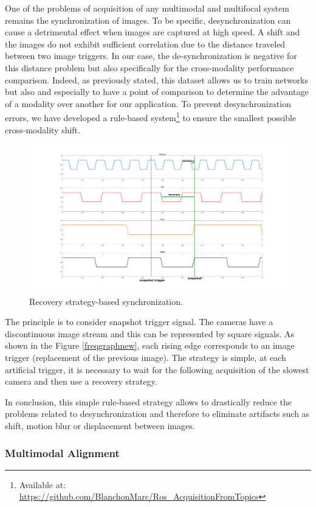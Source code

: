 One of the problems of acquisition of any multimodal and multifocal system remains the synchronization of images. To be specific, desynchronization can cause a detrimental effect when images are captured at high speed. A shift and the images do not exhibit sufficient correlation due to the distance traveled between two image triggers.
In our case, the de-synchronization is negative for this distance problem but also specifically for the cross-modality performance comparison. Indeed, as previously stated, this dataset allows us to train networks but also and especially to have a point of comparison to determine the advantage of a modality over another for our application.
To prevent desynchronization errors, we have developed a rule-based system\footnote{Available at: \url{https://github.com/BlanchonMarc/Ros_AcquisitionFromTopics}} to ensure the smallest possible cross-modality shift.

\begin{figure}[h]
	\centering
	\includegraphics[width=0.8\linewidth]{Figures/Dataset/freqgraphnew}
	\caption{Recovery strategy-based synchronization.}
	\label{fig:freqgraphnew}
\end{figure}


The principle is to consider snapshot trigger signal. The cameras have a discontinuous image stream and this can be represented by square signals. As shown in the Figure \ref{freqgraphnew}, each rising edge corresponds to an image trigger (replacement of the previous image). The strategy is simple, at each artificial trigger, it is necessary to wait for the following acquisition of the slowest camera and then use a recovery strategy.

In conclusion, this simple rule-based strategy allows to drastically reduce the problems related to desynchronization and therefore to eliminate artifacts such as shift, motion blur or displacement between images.

\subsubsection{Multimodal Alignment}\label{align}

